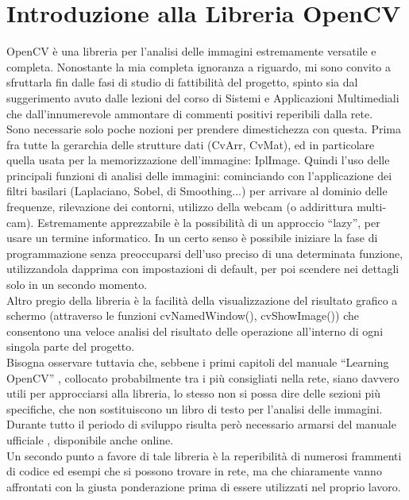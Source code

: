 \documentclass[a4paper,10pt, twocolumn]{article}
\begin{document}
\section{Introduzione alla Libreria OpenCV}
OpenCV \`{e} una libreria per l'analisi delle immagini estremamente versatile e completa.
Nonostante la mia completa ignoranza a riguardo, mi sono convito a sfruttarla fin 
dalle fasi di studio di fattibilit\`{a} del progetto, 
spinto sia dal suggerimento avuto dalle lezioni del corso di 
Sistemi e Applicazioni Multimediali \cite{slide} che dall'innumerevole ammontare di 
commenti positivi reperibili dalla rete.\\
Sono necessarie solo poche nozioni per prendere dimestichezza con questa. 
Prima fra tutte la gerarchia delle strutture dati (CvArr, CvMat), ed 
in particolare quella usata per la memorizzazione dell'immagine:
IplImage. Quindi l'uso delle principali funzioni di analisi delle 
immagini: cominciando con l'applicazione dei filtri basilari (Laplaciano,
Sobel, di Smoothing...) per arrivare al dominio delle frequenze, 
rilevazione dei contorni, utilizzo della webcam (o addirittura multi-cam). 
Estremamente apprezzabile \`{e} la possibilit\`{a} di un
approccio ``lazy'', per usare un termine informatico. In un certo senso \`{e} possibile
iniziare la fase di programmazione senza preoccuparsi dell'uso preciso di una 
determinata funzione, utilizzandola dapprima con impostazioni di default,
per poi scendere nei dettagli solo in un secondo momento.\\
Altro pregio della libreria \`{e} la facilit\`{a} della visualizzazione del risultato
grafico a schermo (attraverso le funzioni cvNamedWindow(), cvShowImage()) che
consentono una veloce analisi del risultato delle operazione all'interno di
ogni singola parte del progetto.\\
Bisogna osservare tuttavia che, sebbene i primi capitoli del manuale ``Learning
OpenCV'' \cite{opencvOReally},
collocato probabilmente tra i pi\`{u} consigliati nella rete, siano davvero utili 
per approcciarsi alla libreria, lo stesso non si possa dire delle sezioni pi\`{u}
specifiche, che non sostituiscono un libro di testo per l'analisi delle immagini.
Durante tutto il periodo di sviluppo risulta per\`{o} necessario armarsi del 
manuale ufficiale \cite{opencvReference}, disponibile anche online.\\
Un secondo punto a favore di tale libreria \`{e} la reperibilit\`{a} di numerosi 
frammenti di codice ed esempi che si possono trovare in rete, ma che chiaramente
vanno affrontati con la giusta ponderazione prima di essere utilizzati nel
proprio lavoro.
  
\end{document}
